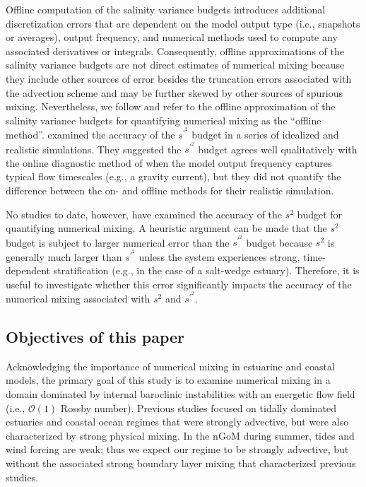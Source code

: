 Offline computation of the salinity variance budgets introduces additional discretization errors that are dependent on the model output type (i.e., snapshots or averages), output frequency, and numerical methods used to compute any associated derivatives or integrals. Consequently, offline approximations of the salinity variance budgets are not direct estimates of numerical mixing because they include other sources of error besides the truncation errors associated with the advection scheme and may be further skewed by other sources of spurious mixing. Nevertheless, we follow \citet{Wang_2021} and refer to the offline approximation of the salinity variance budgets for quantifying numerical mixing as the ``offline method''. \citet{Wang_2021} examined the accuracy of the $s^{\prime^2}$ budget in a series of idealized and realistic simulations. They suggested the $s^{\prime^2}$ budget agrees well qualitatively with the online diagnostic method of \citet{Burchard_2008} when the model output frequency captures typical flow timescales (e.g., a gravity current), but they did not quantify the difference between the on- and offline methods for their realistic simulation.  

No studies to date, however, have examined the accuracy of the $s^2$ budget for quantifying numerical mixing. A heuristic argument can be made that the $s^2$ budget is subject to larger numerical error than the $s^{\prime^2}$ budget because $s^2$ is generally much larger than $s^{\prime^2}$ unless the system experiences strong, time-dependent stratification (e.g., in the case of a salt-wedge estuary). Therefore, it is useful to investigate whether this error significantly impacts the accuracy of the numerical mixing associated with $s^2$ and $s^{\prime^2}$. 

\subsection{Objectives of this paper} \label{sec:objectives}

Acknowledging the importance of numerical mixing in estuarine and coastal models, the primary goal of this study is to examine numerical mixing in a domain dominated by internal baroclinic instabilities with an energetic flow field (i.e., $\mathcal{O}(1)$ Rossby number). Previous studies focused on tidally dominated estuaries \citep{Broatch_2022, MacCready_2018, Ralston_2017, Wang_2018} and coastal ocean \citep{Wang_2021} regimes that were strongly advective, but were also characterized by strong physical mixing. In the nGoM during summer, tides and wind forcing are weak; thus we expect our regime to be strongly advective, but without the associated strong boundary layer mixing that characterized previous studies.

